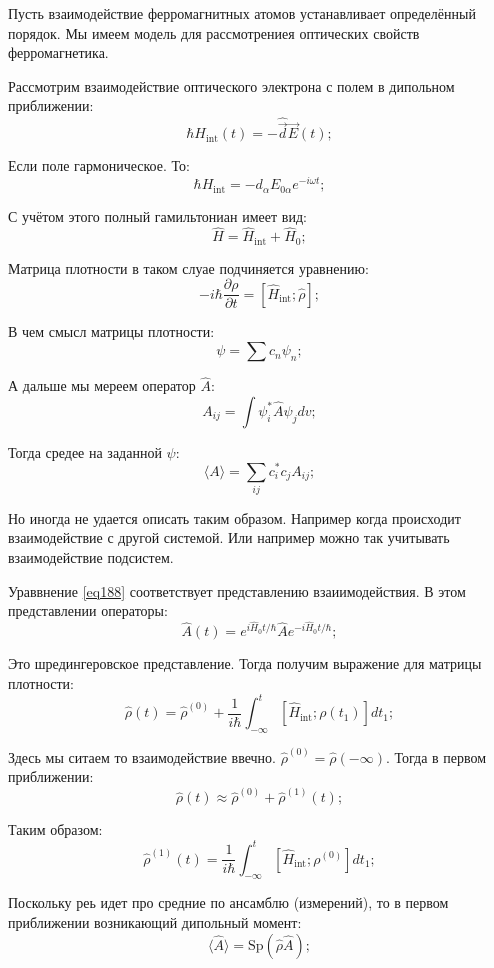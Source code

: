\documentclass[a4paper, 14pt, russian]{article}
\newcommand{\be}{\begin{equation}}
\newcommand{\ee}{\end{equation}}
\newcommand{\pa}{\partial}
\begin{document}
	Пусть взаимодействие ферромагнитных атомов устанавливает определённый порядок. Мы имеем модель для рассмотрениея оптических свойств ферромагнетика.

	Рассмотрим взаимодействие оптического электрона с полем в дипольном приближении:
	\be
		\label{eq185}
		\hbar{H}_\text{int}(t) = - \hat{\vec d} \vec E(t);
	\ee

	Если поле гармоническое. То:
	\be
		\label{eq186}
		\hbar{H}_\text{int} = -d_\alpha E_{0\alpha}e^{-i\omega t};
	\ee

	С учётом этого полный гамильтониан имеет вид:
	\be
		\label{eq187}
		\hat{H} = \hat{H}_\text{int} + \hat{H}_0;
	\ee

	Матрица плотности в таком слуае подчиняется уравнению:
	\be
		\label{eq188}
		-i\hbar \frac{\pa \rho}{\pa t} = [\hat{H}_\text{int};\hat{\rho}];
	\ee

	В чем смысл матрицы плотности:
	\be
		\psi = \sum c_n \psi_n;
	\ee

	А дальше мы мереем оператор $\hat A$:
	\be
		A_{ij} = \int \psi_i^{*} \hat{A} \psi_j dv; 
	\ee

	Тогда средее на заданной $\psi$:
	\be
		\langle A \rangle = \sum_{ij} c_i^{*} c_{j} A_{ij};
	\ee

	Но иногда не удается описать таким образом. Например когда происходит
	взаимодействие с другой системой. Или например можно так учитывать взаимодействие подсистем.

	Ураввнение \ref{eq188} соответствует представлению взаиимодействия. В этом представлении операторы:
	\be
		\label{eq189}
		\hat{A}(t) = e^{i \hat{H}_0 t / \hbar} \hat{A} e^{-i \hat{H}_0 t / \hbar};
	\ee

	Это шредингеровское представление. Тогда получим выражение для матрицы плотности:
	\be
		\label{eq190}
		\hat{\rho} (t) = \hat{\rho}^{(0)} +\frac{1}{i\hbar}\int_{-\infty}^t
			[\hat{H}_\text{int};\rho(t_1)] dt_1;
	\ee

	Здесь мы ситаем то взаимодействие ввечно. $\hat{\rho}^{(0)} = \hat{\rho}(-\infty)$.
	Тогда в первом приближении:
	\be
		\hat{\rho} (t) \approx \hat{\rho}^{(0)} + \hat{\rho}^{(1)}(t);
	\ee

	Таким образом:
	\be
		\label{eq191}
		\hat{\rho}^{(1)}(t) = \frac{1}{i\hbar} \int_{-\infty}^t
			[\hat{H}_\text{int};\rho^{(0)}] dt_1;
	\ee

	Поскольку реь идет про средние по ансамблю (измерений), то в первом приближении возникающий дипольный момент:
	\be
		\langle \hat{A} \rangle = \text{Sp}(\hat{\rho}\hat{A});
	\ee
\end{document}

